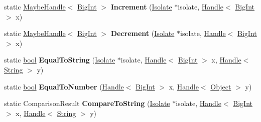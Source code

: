 \begin{DoxyCompactItemize}
static \mbox{\hyperlink{classv8_1_1internal_1_1MaybeHandle}{Maybe\+Handle}}$<$ \mbox{\hyperlink{classv8_1_1internal_1_1BigInt}{Big\+Int}} $>$ {\bfseries Increment} (\mbox{\hyperlink{classv8_1_1internal_1_1Isolate}{Isolate}} $\ast$isolate, \mbox{\hyperlink{classv8_1_1internal_1_1Handle}{Handle}}$<$ \mbox{\hyperlink{classv8_1_1internal_1_1BigInt}{Big\+Int}} $>$ x)
\item 
\mbox{\label{classv8_1_1internal_1_1BigInt_af95c19873bcd404aec5d20d8e5dd4a2d}} 
static \mbox{\hyperlink{classv8_1_1internal_1_1MaybeHandle}{Maybe\+Handle}}$<$ \mbox{\hyperlink{classv8_1_1internal_1_1BigInt}{Big\+Int}} $>$ {\bfseries Decrement} (\mbox{\hyperlink{classv8_1_1internal_1_1Isolate}{Isolate}} $\ast$isolate, \mbox{\hyperlink{classv8_1_1internal_1_1Handle}{Handle}}$<$ \mbox{\hyperlink{classv8_1_1internal_1_1BigInt}{Big\+Int}} $>$ x)
\item 
\mbox{\label{classv8_1_1internal_1_1BigInt_a315ec21c483dcfcd1c98e02b0fedea9a}} 
static \mbox{\hyperlink{classbool}{bool}} {\bfseries Equal\+To\+String} (\mbox{\hyperlink{classv8_1_1internal_1_1Isolate}{Isolate}} $\ast$isolate, \mbox{\hyperlink{classv8_1_1internal_1_1Handle}{Handle}}$<$ \mbox{\hyperlink{classv8_1_1internal_1_1BigInt}{Big\+Int}} $>$ x, \mbox{\hyperlink{classv8_1_1internal_1_1Handle}{Handle}}$<$ \mbox{\hyperlink{classv8_1_1internal_1_1String}{String}} $>$ y)
\item 
\mbox{\label{classv8_1_1internal_1_1BigInt_a2927d5f7222951f5a8afa374dc5fe080}} 
static \mbox{\hyperlink{classbool}{bool}} {\bfseries Equal\+To\+Number} (\mbox{\hyperlink{classv8_1_1internal_1_1Handle}{Handle}}$<$ \mbox{\hyperlink{classv8_1_1internal_1_1BigInt}{Big\+Int}} $>$ x, \mbox{\hyperlink{classv8_1_1internal_1_1Handle}{Handle}}$<$ \mbox{\hyperlink{classv8_1_1internal_1_1Object}{Object}} $>$ y)
\item 
\mbox{\label{classv8_1_1internal_1_1BigInt_afeb9e88c2fbfc5e49332482ffddedbff}} 
static Comparison\+Result {\bfseries Compare\+To\+String} (\mbox{\hyperlink{classv8_1_1internal_1_1Isolate}{Isolate}} $\ast$isolate, \mbox{\hyperlink{classv8_1_1internal_1_1Handle}{Handle}}$<$ \mbox{\hyperlink{classv8_1_1internal_1_1BigInt}{Big\+Int}} $>$ x, \mbox{\hyperlink{classv8_1_1internal_1_1Handle}{Handle}}$<$ \mbox{\hyperlink{classv8_1_1internal_1_1String}{String}} $>$ y)

\end{DoxyCompactItemize}
